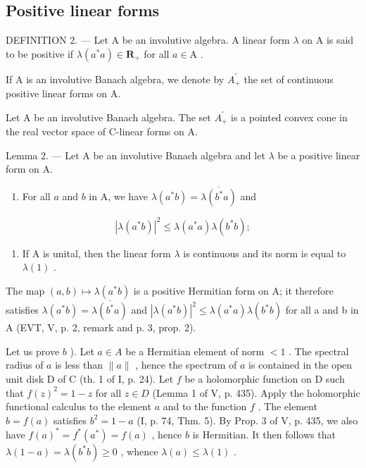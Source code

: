 \subsection{Positive linear forms}

DEFINITION 2. --- Let A be an involutive algebra. A linear form \(\lambda\) on A is said to be positive if \(\lambda(a^{*}a) \in \mathbf{R}_{+}\) for all \(a \in \mathrm{A}\) .

If A is an involutive Banach algebra, we denote by \(A_{+}^{\prime}\) the set of continuous positive linear forms on A.

Let A be an involutive Banach algebra. The set \(A_{+}^{\prime}\) is a pointed convex cone in the real vector space of C-linear forms on A.

Lemma 2. --- Let A be an involutive Banach algebra and let \(\lambda\) be a positive linear form on A.

\begin{enumerate}
\def\labelenumi{\alph{enumi})}
\tightlist
\item
  For all \(a\) and \(b\) in A, we have \(\lambda(a^{*}b)=\overline{\lambda(b^{*}a)}\) and
\end{enumerate}

\[
\left| \lambda \left(a ^ {*} b\right) \right| ^ {2} \leqslant \lambda \left(a ^ {*} a\right) \lambda \left(b ^ {*} b\right);
\]

\begin{enumerate}
\def\labelenumi{\alph{enumi})}
\setcounter{enumi}{1}
\tightlist
\item
  If A is unital, then the linear form \(\lambda\) is continuous and its norm is equal to \(\lambda(1)\) .
\end{enumerate}

The map \((a,b)\mapsto\lambda(a^{*}b)\) is a positive Hermitian form on A; it therefore satisfies \(\lambda(a^{*}b)=\overline{\lambda(b^{*}a)}\) and \(|\lambda(a^{*}b)|^{2}\leqslant\lambda(a^{*}a)\lambda(b^{*}b)\) for all a and b in A (EVT, V, p. 2, remark and p. 3, prop. 2).

Let us prove \(b\) ). Let \(a \in A\) be a Hermitian element of norm \(< 1\) . The spectral radius of \(a\) is less than \(\|a\|\) , hence the spectrum of \(a\) is contained in the open unit disk D of C (th. 1 of I, p. 24). Let \(f\) be a holomorphic function on D such that \(f(z)^{2} = 1 - z\) for all \(z \in D\) (Lemma 1 of V, p. 435). Apply the holomorphic functional calculus to the element \(a\) and to the function \(f\) . The element \(b = f(a)\) satisfies \(b^{2} = 1 - a\) (I, p. 74, Thm. 5). By Prop. 3 of V, p. 435, we also have \(f(a)^{*} = f^{*}(a^{*}) = f(a)\) , hence \(b\) is Hermitian. It then follows that \(\lambda(1 - a) = \lambda(b^{*}b) \geqslant 0\) , whence \(\lambda(a) \leqslant \lambda(1)\) .

